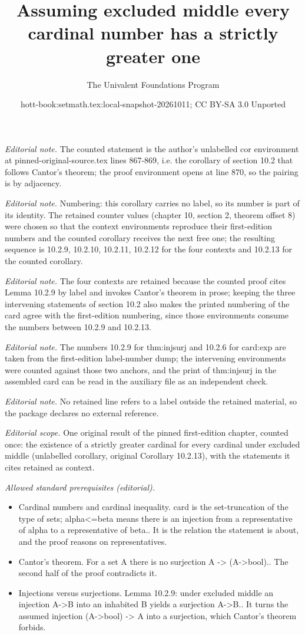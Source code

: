 \documentclass[10pt,a4paper]{article}
\title{Assuming excluded middle every cardinal number has a strictly greater one}
\author{The Univalent Foundations Program}
\date{hott-book:setmath.tex:local-snapshot-20261011; CC BY-SA 3.0 Unported}
\newcounter{chapter}
\theoremstyle{definition}
\theoremstyle{remark}
\numberwithin{equation}{section}
\begin{document}
\maketitle
\setcounter{chapter}{10}
\setcounter{section}{2}
\setcounter{thm}{8}
\noindent\textit{Editorial note.} The counted statement is the author's unlabelled cor environment at pinned-original-source.tex lines 867-869, i.e. the corollary of section 10.2 that follows Cantor's theorem; the proof environment opens at line 870, so the pairing is by adjacency.\par\medskip
\noindent\textit{Editorial note.} Numbering: this corollary carries no label, so its number is part of its identity. The retained counter values (chapter 10, section 2, theorem offset 8) were chosen so that the context environments reproduce their first-edition numbers and the counted corollary receives the next free one; the resulting sequence is 10.2.9, 10.2.10, 10.2.11, 10.2.12 for the four contexts and 10.2.13 for the counted corollary.\par\medskip
\noindent\textit{Editorial note.} The four contexts are retained because the counted proof cites Lemma 10.2.9 by label and invokes Cantor's theorem in prose; keeping the three intervening statements of section 10.2 also makes the printed numbering of the card agree with the first-edition numbering, since those environments consume the numbers between 10.2.9 and 10.2.13.\par\medskip
\noindent\textit{Editorial note.} The numbers 10.2.9 for thm:injsurj and 10.2.6 for card:exp are taken from the first-edition label-number dump; the intervening environments were counted against those two anchors, and the print of thm:injsurj in the assembled card can be read in the auxiliary file as an independent check.\par\medskip
\noindent\textit{Editorial note.} No retained line refers to a label outside the retained material, so the package declares no external reference.\par\medskip
\noindent\textit{Editorial scope.} One original result of the pinned first-edition chapter, counted once: the existence of a strictly greater cardinal for every cardinal under excluded middle (unlabelled corollary, original Corollary 10.2.13), with the statements it cites retained as context.\par\medskip
\noindent\textit{Allowed standard prerequisites (editorial).}\begin{itemize}
\item Cardinal numbers and cardinal inequality. card is the set-truncation of the type of sets; alpha<=beta means there is an injection from a representative of alpha to a representative of beta.. It is the relation the statement is about, and the proof reasons on representatives.
\item Cantor's theorem. For a set A there is no surjection A -> (A->bool).. The second half of the proof contradicts it.
\item Injections versus surjections. Lemma 10.2.9: under excluded middle an injection A->B into an inhabited B yields a surjection A->B.. It turns the assumed injection (A->bool) -> A into a surjection, which Cantor's theorem forbids.
\end{itemize}\medskip
\end{document}
